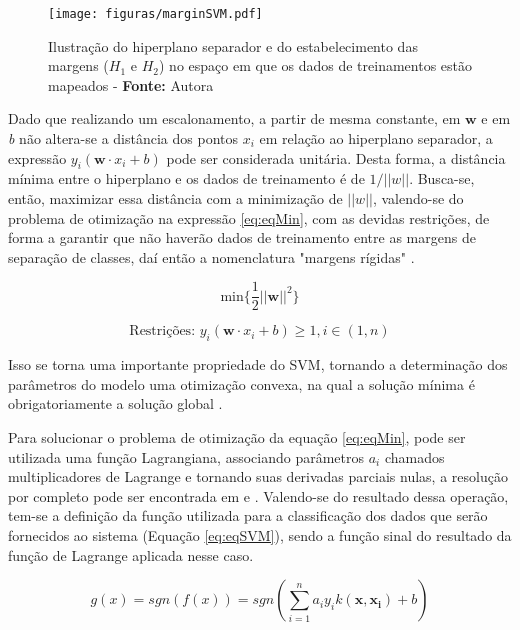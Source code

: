 \begin{figure}[H]
 \centering
  \texttt{[image: figuras/marginSVM.pdf]}
  \caption{Ilustração do hiperplano separador e do estabelecimento das margens ($H_1$ e $H_2$) no espaço em que os dados de treinamentos estão mapeados - \textbf{Fonte:} Autora}
  \label{fig:marginSVM}
\end{figure}

Dado que realizando um escalonamento, a partir de mesma constante, em $\boldsymbol{w}$ e em \textit{b} não altera-se a distância dos pontos $x_i$ em relação ao hiperplano separador, a expressão $y_i(\boldsymbol{w} \cdot x_i + b)$ pode ser considerada unitária. Desta forma, a distância mínima entre o hiperplano e os dados de treinamento é de $1/||w||$. Busca-se, então, maximizar essa distância com a minimização de $||w||$, valendo-se do problema de otimização na expressão \ref{eq:eqMin}, com as devidas restrições, de forma a garantir que não haverão dados de treinamento entre as margens de separação de classes, daí então a nomenclatura "margens rígidas" .

\begin{equation}
\label{eq:eqMin}
  \text{min}\{\frac{1}{2}||\boldsymbol{w}||^2\}
\end{equation}

\begin{equation}
\label{eq:eqRestrição}
  \text{Restrições: } y_i(\boldsymbol{w} \cdot x_i + b) \geq 1, i \in (1,n)
\end{equation}

Isso se torna uma importante propriedade do SVM, tornando a determinação dos parâmetros do modelo uma otimização convexa, na qual a solução mínima é obrigatoriamente a solução global .

Para solucionar o problema de otimização da equação \ref{eq:eqMin}, pode ser utilizada uma função Lagrangiana, associando parâmetros $a_i$ chamados multiplicadores de Lagrange e tornando suas derivadas parciais nulas, a resolução por completo pode ser encontrada em  e . Valendo-se do resultado dessa operação, tem-se a definição da função utilizada para a classificação dos dados que serão fornecidos ao sistema (Equação \ref{eq:eqSVM}), sendo a função sinal do resultado da função de Lagrange aplicada nesse caso.

\begin{equation}
\label{eq:eqSVM}
  g(x) = sgn(f(x)) = sgn(\displaystyle\sum_{i=1}^{n}a_iy_ik(\boldsymbol{x},\boldsymbol{x_i})+b)
\end{equation}

